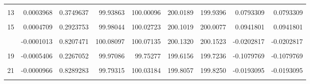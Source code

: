 \documentclass[a4paper]{tufte-handout}
\begin{document}
\begin{table}
{\begin{tabular}[t]{rrrrrrrrr}
\addlinespace
\cellcolor{gray!6}{12} & \cellcolor{gray!6}{-0.0002869} & \cellcolor{gray!6}{0.5211490} & \cellcolor{gray!6}{100.06612} & \cellcolor{gray!6}{100.07150} & \cellcolor{gray!6}{200.0802} & \cellcolor{gray!6}{200.1376} & \cellcolor{gray!6}{-0.0574237} & \cellcolor{gray!6}{-0.0574237}\\
13 & 0.0003968 & 0.3749637 & 99.93863 & 100.00096 & 200.0189 & 199.9396 & 0.0793309 & 0.0793309\\
\cellcolor{gray!6}{14} & \cellcolor{gray!6}{0.0008604} & \cellcolor{gray!6}{0.0543707} & \cellcolor{gray!6}{99.98128} & \cellcolor{gray!6}{99.98778} & \cellcolor{gray!6}{200.1411} & \cellcolor{gray!6}{199.9691} & \cellcolor{gray!6}{0.1720497} & \cellcolor{gray!6}{0.1720497}\\
15 & 0.0004709 & 0.2923753 & 99.98044 & 100.02723 & 200.1019 & 200.0077 & 0.0941801 & 0.0941801\\
\cellcolor{gray!6}{16} & \cellcolor{gray!6}{-0.0000638} & \cellcolor{gray!6}{0.8866115} & \cellcolor{gray!6}{99.98576} & \cellcolor{gray!6}{99.90296} & \cellcolor{gray!6}{199.8760} & \cellcolor{gray!6}{199.8887} & \cellcolor{gray!6}{-0.0127468} & \cellcolor{gray!6}{-0.0127468}\\
\addlinespace
17 & -0.0001013 & 0.8207471 & 100.08097 & 100.07135 & 200.1320 & 200.1523 & -0.0202817 & -0.0202817\\
\cellcolor{gray!6}{18} & \cellcolor{gray!6}{-0.0003408} & \cellcolor{gray!6}{0.4460659} & \cellcolor{gray!6}{100.08435} & \cellcolor{gray!6}{99.94296} & \cellcolor{gray!6}{199.9591} & \cellcolor{gray!6}{200.0273} & \cellcolor{gray!6}{-0.0681638} & \cellcolor{gray!6}{-0.0681638}\\
19 & -0.0005406 & 0.2267052 & 99.97086 & 99.75277 & 199.6156 & 199.7236 & -0.1079769 & -0.1079769\\
\cellcolor{gray!6}{20} & \cellcolor{gray!6}{-0.0002751} & \cellcolor{gray!6}{0.5385090} & \cellcolor{gray!6}{100.00111} & \cellcolor{gray!6}{99.96321} & \cellcolor{gray!6}{199.9093} & \cellcolor{gray!6}{199.9643} & \cellcolor{gray!6}{-0.0550037} & \cellcolor{gray!6}{-0.0550037}\\
21 & -0.0000966 & 0.8289283 & 99.79315 & 100.03184 & 199.8057 & 199.8250 & -0.0193095 & -0.0193095\\
\addlinespace
\cellcolor{gray!6}{22} & \cellcolor{gray!6}{-0.0004900} & \cellcolor{gray!6}{0.2732492} & \cellcolor{gray!6}{100.04193} & \cellcolor{gray!6}{99.81521} & \cellcolor{gray!6}{199.7592} & \cellcolor{gray!6}{199.8571} & \cellcolor{gray!6}{-0.0979244} & \cellcolor{gray!6}{-0.0979244}\\

\end{tabular}}
\end{table}
\end{document}
